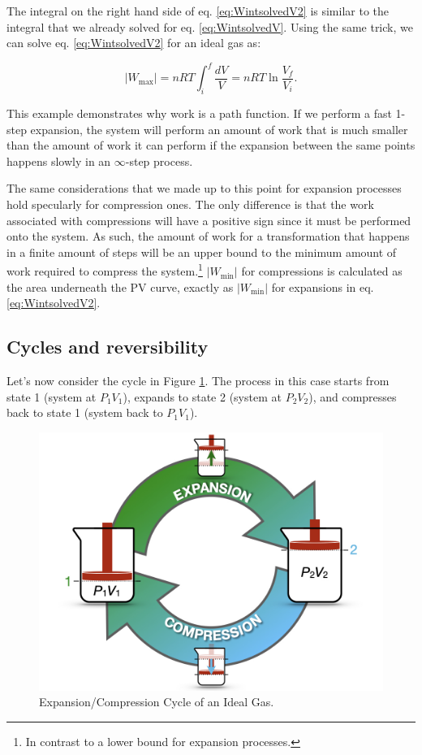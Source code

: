 \documentclass[
  9pt,
]{extbook}
\theoremstyle{definition}
\theoremstyle{definition}
\theoremstyle{definition}
\theoremstyle{remark}
\begin{document}
The integral on the right hand side of eq. \eqref{eq:WintsolvedV2} is similar to the integral that we already solved for eq. \eqref{eq:WintsolvedV}. Using the same trick, we can solve eq. \eqref{eq:WintsolvedV2} for an ideal gas as:

\begin{equation}
  \left| W_{\text{max}} \right| = nRT \int_{i}^{f} \frac{dV}{V} = nRT \ln \frac{V_f}{V_i}.
  \label{eq:WmaxV}
\end{equation}

This example demonstrates why work is a path function. If we perform a fast 1-step expansion, the system will perform an amount of work that is much smaller than the amount of work it can perform if the expansion between the same points happens slowly in an \(\infty\)-step process.

The same considerations that we made up to this point for expansion processes hold specularly for compression ones. The only difference is that the work associated with compressions will have a positive sign since it must be performed onto the system. As such, the amount of work for a transformation that happens in a finite amount of steps will be an upper bound to the minimum amount of work required to compress the system.\footnote{In contrast to a lower bound for expansion processes.} \(\left| W_{\text{min}} \right|\) for compressions is calculated as the area underneath the PV curve, exactly as \(\left| W_{\text{min}} \right|\) for expansions in eq. \eqref{eq:WintsolvedV2}.

\hypertarget{cycles-and-reversibility}{%
\subsection{Cycles and reversibility}\label{cycles-and-reversibility}}

Let's now consider the cycle in Figure \ref{fig:FigRevCyc}. The process in this case starts from state 1 (system at \(P_1V_1\)), expands to state 2 (system at \(P_2V_2\)), and compresses back to state 1 (system back to \(P_1V_1\)).

\begin{figure}

{\centering \includegraphics[width=0.8\linewidth]{./img/OEP_Figures.005} 

}

\caption{Expansion/Compression Cycle of an Ideal Gas.}\label{fig:FigRevCyc}
\end{figure}
\end{document}
